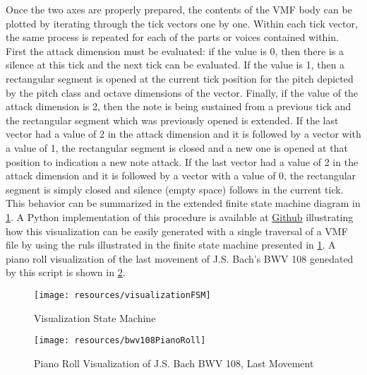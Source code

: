 Once the two axes are properly prepared, the contents of the VMF body can be plotted by iterating through the tick vectors one by one. Within each tick vector, the same process is repeated for each of the parts or voices contained within. First the attack dimension must be evaluated: if the value is 0, then there is a silence at this tick and the next tick can be evaluated. If the value is 1, then a rectangular segment is opened at the current tick position for the pitch depicted by the pitch class and octave dimensions of the vector. Finally, if the value of the attack dimension is 2, then the note is being sustained from a previous tick and the rectangular segment which was previously opened is extended. If the last vector had a value of 2 in the attack dimension and it is followed by a vector with a value of 1, the rectangular segment is closed and a new one is opened at that position to indication a new note attack. If the last vector had a value of 2 in the attack dimension and it is followed by a vector with a value of 0, the rectangular segment is simply closed and silence (empty space) follows in the current tick. This behavior can be summarized in the extended finite state machine diagram in \ref{fig:visualizationStateMachine}. A Python implementation of this procedure is available at \href{https://github.com/project-schumann/vmf-visualization}{Github} illustrating how this visualization can be easily generated with a single traversal of a VMF file by using the ruls illustrated in the finite state machine presented in \ref{fig:visualizationStateMachine}. A piano roll visualization of the last movement of J.S. Bach's BWV 108 genedated by this script is shown in \ref{fig:bwv108PianoRoll}.

\begin{figure}
  \begin{center}
    \texttt{[image: resources/visualizationFSM]}
    \caption{Visualization State Machine}
    \label{fig:visualizationStateMachine}
  \end{center}
\end{figure}

\begin{figure}
  \begin{center}
    \texttt{[image: resources/bwv108PianoRoll]}
    \caption{Piano Roll Visualization of J.S. Bach BWV 108, Last Movement}
    \label{fig:bwv108PianoRoll}
  \end{center}
\end{figure}